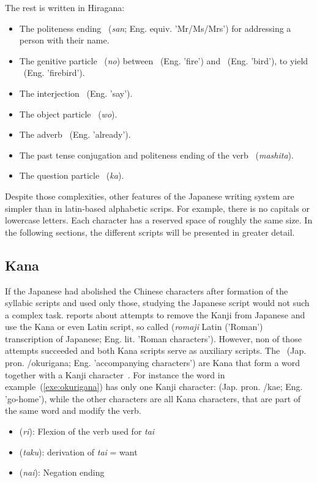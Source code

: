 The rest is written in Hiragana:
\begin{itemize}
  \item The politeness ending ~(\emph{san}; 
        Eng. equiv. 'Mr/Ms/Mrs') for addressing a person with their name.
  \item The genitive particle ~(\emph{no}) between 
        ~(Eng. 'fire') and ~(Eng. 'bird'), to yield 
        ~(Eng. 'firebird').
  \item The interjection ~(Eng. 'say').
  \item The object particle ~(\emph{wo}).
  \item The adverb ~(Eng. 'already').
  \item The past tense conjugation and politeness ending of the 
        verb ~(\emph{mashita}).
  \item The question particle ~(\emph{ka}).
\end{itemize}


Despite those complexities, other features of the Japanese writing system are 
simpler than in latin-based alphabetic scrips. 
For example, there is no capitals or lowercase letters.
Each character has a reserved space of roughly the same size.
In the following sections, the different scripts will be presented in greater 
detail.

\subsection{Kana }
\label{sec:kana}

If the Japanese had abolished the Chinese characters after formation of the
syllabic scripts and used only those, studying the Japanese script would not
such a complex task.  reports about attempts to remove
the Kanji from Japanese and use the Kana or even Latin script, so called
 (\emph{romaji} Latin ('Roman') transcription of Japanese; Eng. lit.
'Roman characters'). However, non of those attempts succeeded and both Kana
scripts serve as auxiliary scripts. The ~(Jap. pron. 
/okurigana; Eng. 'accompanying characters') are Kana that form 
a word together with a Kanji character~.
For instance the word in example~(\ref{exe:okurigana}) has only one Kanji 
character:  (Jap. pron. /kae; Eng. 'go-home'), while the other characters are all Kana characters, that are part of the same word and modify
the verb.
\begin{itemize}
  \item {} (\emph{ri}): Flexion of the verb used for \emph{tai}
  \item {} (\emph{taku}): derivation of \emph{tai} = want
  \item {} (\emph{nai}): Negation ending
\end{itemize}

